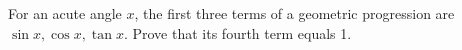 For an acute angle $x$, the first three terms of a geometric progression are $\sin x,\cos x,\tan x$. Prove that its fourth term equals 1.
